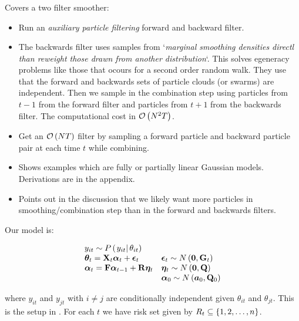 \subsubsection*{\cite{fearnhead10}}
Covers a two filter smoother:
\begin{itemize}
	\item Run an \emph{auxiliary particle filtering} forward and backward filter.
	\item The backwards filter uses samples from `\textit{marginal smoothing densities directl than reweight those drawn from another distribution}`. This solves egeneracy problems  like those that ocours for a second order random walk. They use that the forward and backwards sets of particle clouds (or swarms) are independent. Then we sample in the combination step using particles from $t-1$ from the forward filter and particles from $t + 1$ from the backwards filter. The computational cost in $\mathcal{O}\left( N^2T\right)$.
	\item Get an $\mathcal{O}\left( NT\right)$ filter by sampling a forward particle and backward particle pair at each time $t$ while combining.
	\item Shows examples which are fully or partially linear Gaussian models. Derivations are in the appendix.
	\item Points out in the discussion that we likely want more particles in smoothing/combination step than in the forward and backwards filters.
\end{itemize}



\iffalse
Our model is:

\begin{equation}
\begin{array}{ll}
 	y_{it} \sim \propC{y_{it}}{\theta_{it}} & \\
%
 	\vec{\theta}_{t} = \mat{X}_t\vec{\alpha}_t + \vec{\epsilon}_t & 
  		\vec{\epsilon}_t \sim N\Lparen{\vec{0}, \mat{G}_t} \\
% 
 	\vec{\alpha}_t = \mat{F}\vec{\alpha}_{t - 1} + \mat{R}\vec{\eta}_t &
 		\vec{\eta}_t \sim N\Lparen{\vec{0}, \mat{Q}} \\
%
	&	\vec{\alpha}_0 \sim N\Lparen{\vec{a}_0, \mat{Q}_0}
 \end{array}
\end{equation}

where $y_{it}$ and $y_{jt}$ with $i\neq j$ are conditionally independent given $\theta_{it}$ and $\theta_{jt}$. This is the setup in \cite{andrieu02}. For each $t$ we have risk set given by $R_t \subseteq \left\{ 1,2,\dots,n\right\}$.

